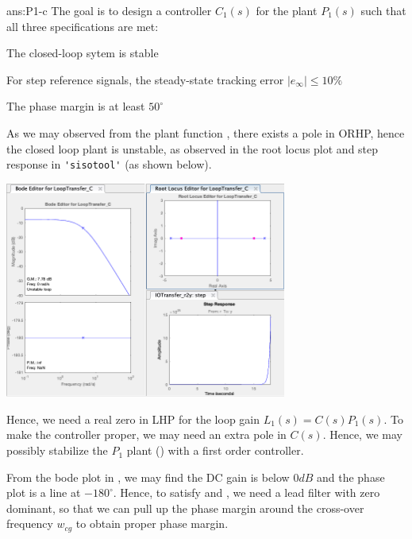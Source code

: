 \documentclass{tron}
\begin{document}
\begin{answer}{ans:P1-c}
	The goal is to design a controller $C_1(s)$ for the plant $P_1(s)$ such that all three specifications are met:
	\begin{spec-list}
		\item The closed-loop sytem is stable \label{spec:stable}
		\item For step reference signals, the steady-state tracking error $|e_\infty| \leq 10\%$ \label{spec:ess}
		\item The phase margin is at least $50^\circ$ \label{spec:pm}
	\end{spec-list}


	As we may observed from the plant function , there exists a pole in \Gls{ORHP}, hence the closed loop plant is unstable, as observed in the root locus plot and step response in \verb|'sisotool'| (as shown  below). 
	
	{	
		\centering
      	\includegraphics[width=350px]{Fig/sisotool-p1}
      	\par
    }
    
    Hence, we need a real zero in \Gls{LHP} for the loop gain $L_1(s) = C(s)P_1(s)$. To make the controller proper, we may need an extra pole in $C(s)$. Hence, we may possibly stabilize the $P_1$ plant () with a first order controller. 

	From the bode plot in , we may find the DC gain is below $0\unit{dB}$ and the phase plot is a line at $-180^\circ$. Hence, to satisfy  and , we need a lead filter with zero dominant, so that we can pull up the phase margin around the cross-over frequency $w_{cg}$ to obtain proper phase margin.
	

\end{answer}
\end{document}
